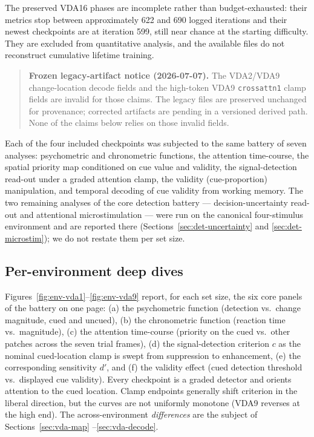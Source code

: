 The preserved VDA16 phases are incomplete rather than budget-exhausted: their metrics
stop between approximately 622 and 690 logged iterations and their newest checkpoints
are at iteration 599, still near chance at the starting difficulty. They are excluded
from quantitative analysis, and the available files do not reconstruct cumulative
lifetime training.

\begin{quote}\small
\textbf{Frozen legacy-artifact notice (2026-07-07).} The VDA2/VDA9
change-location decode fields and the high-token VDA9 \texttt{crossattn1} clamp
fields are invalid for those claims. The legacy files are preserved unchanged for
provenance; corrected artifacts are pending in a versioned derived path. None of the
claims below relies on those invalid fields.
\end{quote}

Each of the four included checkpoints was subjected to the same battery of
seven analyses: psychometric and chronometric functions, the attention time-course, the
spatial priority map conditioned on cue value and validity, the signal-detection
read-out under a graded attention clamp, the validity (cue-proportion) manipulation, and
temporal decoding of cue validity from working memory. The two remaining analyses of the
core detection battery --- decision-uncertainty read-out and attentional microstimulation
--- were run on the canonical four-stimulus environment and are reported there
(Sections~\ref{sec:det-uncertainty} and \ref{sec:det-microstim}); we do not restate them
per set size.

\subsection{Per-environment deep dives}
\label{sec:vda-perenv}

Figures~\ref{fig:env-vda1}--\ref{fig:env-vda9} report, for each set size, the six
core panels of the battery on one page: (a) the psychometric function (detection vs.\
change magnitude, cued and uncued), (b) the chronometric function (reaction time vs.\
magnitude), (c) the attention time-course (priority on the cued vs.\ other patches
across the seven trial frames), (d) the signal-detection criterion $c$ as the nominal cued-location clamp is swept from suppression to enhancement, (e) the corresponding
sensitivity $d'$, and (f) the validity effect (cued detection threshold vs.\ displayed
cue validity). Every checkpoint is a graded detector and orients attention to the
cued location. Clamp endpoints generally shift criterion in the liberal direction,
but the curves are not uniformly monotone (VDA9 reverses at the high end). The
across-environment \emph{differences} are the subject of Sections~\ref{sec:vda-map}
--\ref{sec:vda-decode}.

